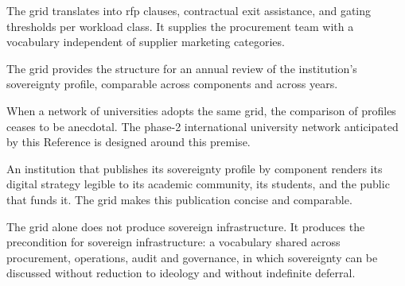 \begin{description}[leftmargin=1.5em,style=nextline,nosep]
  \item[Procurement.] The grid translates into \gls{rfp} clauses,
    contractual exit assistance, and gating thresholds per workload
    class. It supplies the procurement team with a vocabulary
    independent of supplier marketing categories.

  \item[Internal audit.] The grid provides the structure for an annual
    review of the institution's sovereignty profile, comparable across
    components and across years.

  \item[Peer-institution benchmarking.] When a network of universities
    adopts the same grid, the comparison of profiles ceases to be
    anecdotal. The phase-2 international university network anticipated
    by this Reference is designed around this premise.

  \item[Public accountability.] An institution that publishes its
    sovereignty profile by component renders its digital strategy
    legible to its academic community, its students, and the public
    that funds it. The grid makes this publication concise and
    comparable.
\end{description}

\medskip

\noindent The grid alone does not produce sovereign infrastructure. It
produces the precondition for sovereign infrastructure: a vocabulary
shared across procurement, operations, audit and governance, in which
sovereignty can be discussed without reduction to ideology and without
indefinite deferral.
